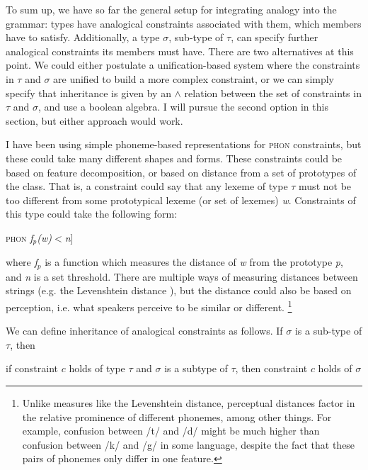 To sum up, we have so far the general setup for integrating analogy into the grammar: types have analogical constraints associated with them, which members have to satisfy. Additionally, a type $\sigma$, sub-type of $\tau$, can specify further analogical constraints its members must have. There are two alternatives at this point. We could either postulate a unification-based system where the constraints in $\tau$ and $\sigma$ are unified to build a more complex constraint, or we can simply specify that inheritance is given by an $\land$ relation between the set of constraints in $\tau$ and $\sigma$, and use a boolean algebra. I will pursue the second option in this section, but either approach would work.

I have been using simple phoneme-based representations for \textsc{phon} constraints, but these could take many different shapes and forms. These constraints could be based on feature decomposition, or based on distance from a set of prototypes of the class. That is, a constraint could say that any lexeme of type $\tau$ must not be too different from some prototypical lexeme (or set of lexemes) \textit{w}. Constraints of this type could take the following form:

\begin{exe}
    \ex {[}\textsc{phon} \textit{f$_p$(w)}$<$\textit{n}{]}
\end{exe}


where \textit{f$_p$} is a function which measures the distance of \textit{w} from the prototype \textit{p}, and \textit{n} is a set threshold. There are multiple ways of measuring distances between strings (e.g. the Levenshtein distance \autocite{Levenshtein.1966}), but the distance  could also be based on perception, i.e. what speakers perceive to be similar or different. \footnote{Unlike measures like the Levenshtein distance, perceptual distances factor in the relative prominence of different phonemes, among other things. For example, confusion between /t/ and /d/ might be much higher than confusion between /k/ and /g/ in some language, despite the fact that these pairs of phonemes only differ in one feature.}

We can define inheritance of analogical constraints as follows. If $\sigma$ is a sub-type of $\tau$, then

\begin{exe}
    \ex if constraint $c$ holds of type $\tau$ and $\sigma$ is a subtype of $\tau$, then constraint $c$ holds of $\sigma$
\end{exe}

